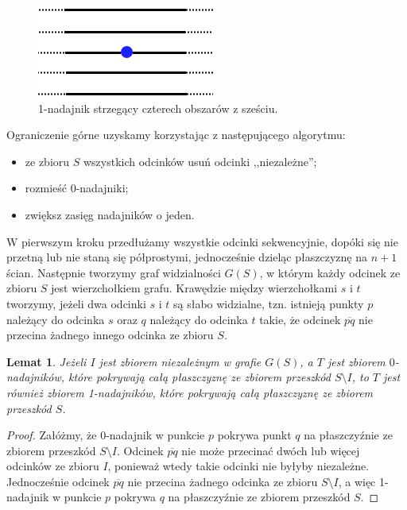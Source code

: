 \documentclass{xmgr}
\newtheorem{Lemat}{Lemat}
\theoremstyle{definition}
\begin{document}
\begin{figure}[ht!]
  \centering
  \includegraphics{rysunki/k_nadajniki_ogr_dolne.png}
  \caption{1-nadajnik strzegący czterech obszarów z sześciu.}
  \label{fig:ogr_dolne}
\end{figure} 

Ograniczenie górne uzyskamy korzystając z następującego algorytmu:
\begin{itemize}
  \item ze zbioru $S$ wszystkich odcinków usuń odcinki ,,niezależne'';
  \item rozmieść 0-nadajniki;
  \item zwiększ zasięg nadajników o jeden.
\end{itemize}

W pierwszym kroku przedłużamy wszystkie odcinki sekwencyjnie, dopóki się nie przetną lub nie staną się półprostymi, jednocześnie dzieląc płaszczyznę na $n + 1$ ścian. Następnie tworzymy graf widzialności $G(S)$, w którym każdy odcinek ze zbioru $S$ jest wierzchołkiem grafu. Krawędzie między wierzchołkami $s$ i $t$ tworzymy, jeżeli dwa odcinki $s$ i $t$ są słabo widzialne, tzn. istnieją punkty $p$ należący do odcinka $s$ oraz $q$ należący do odcinka $t$ takie, że odcinek $\overline{pq}$ nie przecina żadnego innego odcinka ze zbioru $S$.

\begin{Lemat}\label{0-1-nadajniki} \cite{knadajniki}
  Jeżeli $I$ jest zbiorem niezależnym w grafie $G(S)$, a $T$ jest zbiorem $0$-nadajników, które pokrywają całą płaszczyznę ze zbiorem przeszkód $S \setminus I$, to $T$ jest również zbiorem 1-nadajników, które pokrywają całą płaszczyznę ze zbiorem przeszkód $S$.
\end{Lemat}

\begin{proof}
  Załóżmy, że 0-nadajnik w punkcie $p$ pokrywa punkt $q$ na płaszczyźnie ze zbiorem przeszkód $S \setminus I$. Odcinek $\overline{pq}$ nie może przecinać dwóch lub więcej odcinków ze zbioru $I$, ponieważ wtedy takie odcinki nie byłyby niezależne. Jednocześnie odcinek $\overline{pq}$ nie przecina żadnego odcinka ze zbioru $S \setminus I$, a więc 1-nadajnik w punkcie $p$ pokrywa $q$ na płaszczyźnie ze \linebreak zbiorem przeszkód $S$.
\end{proof}
\end{document}
